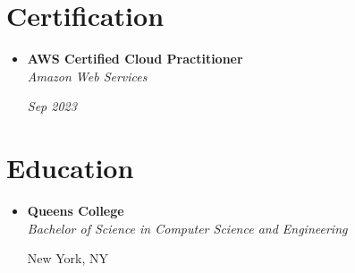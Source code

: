\documentclass[letterpaper,10pt]{article}
\newcommand{\resumeSubheading}[4]{
  \vspace{-2pt}\item
    \begin{minipage}[t]{0.67\textwidth}
      \textbf{#1} \\
      \textit{\small#3}
    \end{minipage}\hfill
    \begin{minipage}[t]{0.30\textwidth}\raggedleft
      #2 \\
      \textit{\small #4}
    \end{minipage}\vspace{-2pt}
}
\newcommand{\resumeOrganizationHeading}[4]{
  \vspace{-2pt}\item
    \begin{minipage}[t]{0.67\textwidth}
      \textbf{#1} \\
      \textit{\small#3}
    \end{minipage}\hfill
    \begin{minipage}[t]{0.30\textwidth}\raggedleft
      \textit{\small #2}
    \end{minipage}\vspace{-2pt}
}
\newcommand{\resumeSubHeadingListStart}{\begin{itemize}[leftmargin=0.15in, label={}]}
\newcommand{\resumeSubHeadingListEnd}{\end{itemize}}
\begin{document}

\section{Certification}
\resumeSubHeadingListStart
  \resumeOrganizationHeading
    {AWS Certified Cloud Practitioner}{Sep 2023}{Amazon Web Services}{}
\resumeSubHeadingListEnd



\section{Education}
\resumeSubHeadingListStart
  \resumeSubheading
    {Queens College}{New York, NY}
    {Bachelor of Science in Computer Science and Engineering}{}
\resumeSubHeadingListEnd
\end{document}
